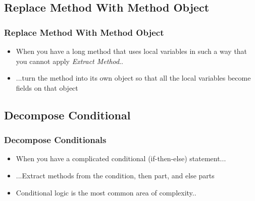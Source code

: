 \documentclass{beamer}
\begin{document}
\subsection{Replace Method With Method Object}
\begin{frame}
  \frametitle{Replace Method With Method Object}
  \begin{itemize}
	\item<+-> When you have a long method that uses local variables in such a way that you cannot apply \textit{Extract Method}..
	\item<+-> ...turn the method into its own object so that all the local variables become fields on that object
   \end{itemize}
\end{frame}

\subsection{Decompose Conditional}
\begin{frame}
  \frametitle{Decompose Conditionals}
  \begin{itemize}
	\item<+-> When you have a complicated conditional (if-then-else) statement...
	\item<+-> ...Extract methods from the condition, then part, and else parts
	\item<+-> Conditional logic is the most common area of complexity.. 
   \end{itemize}
\end{frame}
\end{document}
